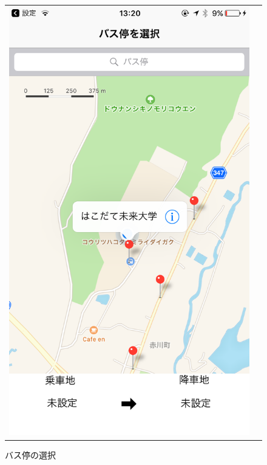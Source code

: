 \documentclass[openany,11pt,papersize]{jsbook}
\begin{document}
  \begin{figure}[H]
    \begin{tabular}{cc}
      \begin{minipage}[t]{0.45\hsize}
        \centering
        \includegraphics[keepaspectratio, scale=0.2]{img/select.png}
        \caption{バス停の選択}
        \label{fig:select}
      \end{minipage} &

\end{tabular}
\end{figure}
\end{document}
